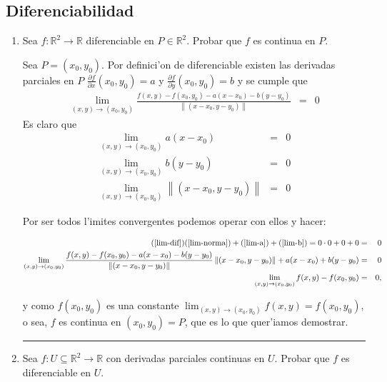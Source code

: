 \documentclass[a4paper,spanish]{article}
\newcommand{\R}[0]{\mathbb{R}}
\newcommand{\norma}[1]{\left\|#1\right\|}
\newcommand{\limite}[2]{\lim_{ #1 \rightarrow #2}}
\newcommand{\parcial}[2]{\frac{\partial #1}{\partial #2}}
\newenvironment{demo}{{\noindent \textbf{Demo: }}}{\hfill\rule{2mm}{2mm}\par}
\begin{document}
\subsection{Diferenciabilidad}

\begin{enumerate}

\item Sea $f : \R^2 \to \R$ diferenciable en $P \in \R^2$. Probar que $f$ es
continua en $P$.

\begin{demo}
Sea $P = (x_0,y_0)$. Por definici'on de diferenciable existen las derivadas
parciales en $P$ $\parcial{f}{x}(x_0,y_0) = a$ y $\parcial{f}{y}(x_0,y_0) = b$
y se cumple que
\begin{eqnarray}
\label {lim-dif}
\limite{(x,y)}{(x_0,y_0)} \frac{f(x,y) - f(x_0,y_0) - a(x-x_0) - b(y-y_0)}
                                 { \norma{(x-x_0,y-y_0)}} &=& 0
\end{eqnarray}
Es claro que
\begin{eqnarray}
\label{lim-a} \limite{(x,y)}{(x_0,y_0)} a(x-x_0) &=& 0 \\
\label{lim-b} \limite{(x,y)}{(x_0,y_0)} b(y-y_0) &=& 0 \\
\label{lim-norma}\limite{(x,y)}{(x_0,y_0)} \norma{(x-x_0,y-y_0)} &=& 0
\end{eqnarray}

Por ser todos l'imites convergentes podemos operar con ellos y hacer:
\begin{small}
\begin{eqnarray*}
(\ref{lim-dif}) (\ref{lim-norma}) + (\ref{lim-a}) + (\ref{lim-b}) = 
	0 \cdot 0 + 0 + 0 &=& 0 \\
\limite{(x,y)}{(x_0,y_0)} 
\frac{f(x,y) - f(x_0,y_0) - a(x-x_0) - b(y-y_0)}{ \norma{(x-x_0,y-y_0)}}
	\norma{(x-x_0,y-y_0)} + a(x-x_0) + b(y-y_0) &=& 0 \\
\limite{(x,y)}{(x_0,y_0)}  f(x,y) - f(x_0,y_0) &=& 0, \\
\end{eqnarray*}
\end{small}
y como $f(x_0,y_0)$ es una constante 
$\limite{(x,y)}{(x_0,y_0)} f(x,y) = f(x_0,y_0)$, o sea, $f$ es continua en
$(x_0,y_0) = P$, que es lo que quer'iamos demostrar.
\end{demo}

\item Sea $f : U \subseteq \R^2 \to \R$ con derivadas parciales continuas en 
$U$. Probar que $f$ es diferenciable en $U$.


\end{enumerate}
\end{document}
